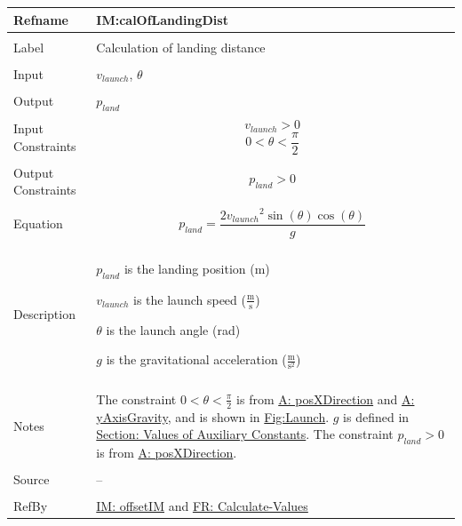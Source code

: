 \documentclass[12pt]{article}
\begin{document}
\noindent \begin{minipage}{\textwidth}
\begin{tabular}{p{} p{}}
\toprule \textbf{Refname} & \textbf{IM:calOfLandingDist}
\label{IM:calOfLandingDist}
\\ \midrule \\
Label & Calculation of landing distance
\\ \midrule \\
Input & ${v_{launch}}$, $θ$
\\ \midrule \\
Output & ${p_{land}}$
\\ \midrule \\
Input Constraints & \begin{displaymath}
                    {v_{launch}}>0
                    \end{displaymath}
                    \begin{displaymath}
                    0<θ<\frac{π}{2}
                    \end{displaymath}
\\ \midrule \\
Output Constraints & \begin{displaymath}
                     {p_{land}}>0
                     \end{displaymath}
\\ \midrule \\
Equation & \begin{displaymath}
           {p_{land}}=\frac{2 {v_{launch}}^{2} \sin\left(θ\right) \cos\left(θ\right)}{g}
           \end{displaymath}
\\ \midrule \\
Description & \begin{symbDescription}
              \item{${p_{land}}$ is the landing position (m)}
              \item{${v_{launch}}$ is the launch speed ($\frac{\text{m}}{\text{s}}$)}
              \item{$θ$ is the launch angle (rad)}
              \item{$g$ is the gravitational acceleration ($\frac{\text{m}}{\text{s}^{2}}$)}
              \end{symbDescription}
\\ \midrule \\
Notes & The constraint $0<θ<\frac{π}{2}$ is from \hyperref[posXDirection]{A: posXDirection} and \hyperref[yAxisGravity]{A: yAxisGravity}, and is shown in \hyperref[Figure:Launch]{Fig:Launch}.
        $g$ is defined in \hyperref[Sec:AuxConstants]{Section: Values of Auxiliary Constants}.
        The constraint ${p_{land}}>0$ is from \hyperref[posXDirection]{A: posXDirection}.
\\ \midrule \\
Source & --
\\ \midrule \\
RefBy & \hyperref[IM:offsetIM]{IM: offsetIM} and \hyperref[calcValues]{FR: Calculate-Values}
\\ \bottomrule \end{tabular}
\end{minipage}
\end{document}
